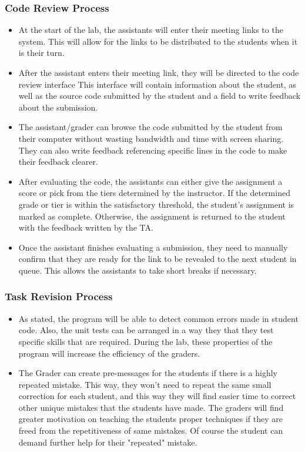 \documentclass[a4paper, 12pt]{article}
\begin{document}
    \subsubsection{Code Review Process}

    \begin{itemize}
        \item At the start of the lab, the assistants will enter their meeting links to the system.
        This will allow for the links to be distributed to the students when it is their turn.
        \item After the assistant enters their meeting link, they will be directed to the code review interface
        This interface will contain information about the student, as well as the source code submitted by the student
        and a field to write feedback about the submission.
        \item The assistant/grader can browse the code submitted by the student from their computer without wasting bandwidth
        and time with screen sharing. They can also write feedback referencing specific lines in the code to make their
        feedback clearer.
        \item After evaluating the code, the assistants can either give the assignment a score or pick
          from the tiers determined by the instructor. If the determined grade or tier is within the satisfactory
          threshold, the student's assignment is marked as complete. Otherwise, the assignment is returned to the
          student with the feedback written by the TA.
        \item Once the assistant finishes evaluating a submission, they need to manually confirm that they are
          ready for the link to be revealed to the next student in queue. This allows the assistants to take short
          breaks if necessary.
    \end{itemize}

    \subsubsection{Task Revision Process}

    \begin{itemize}
      \item As stated, the program will be able to detect common errors made in student code.
      Also, the unit tests can be arranged in a way they that they test specific skills that are
      required. During the lab, these properties of the program will increase the efficiency of the
      graders.
      \item The Grader can create pre-messages for the students if there is a highly repeated
      mistake. This way, they won't need to repeat the same small correction for each student,
      and this way they will find easier time to correct other unique mistakes that the students
      have made. The graders will find greater motivation on teaching the students proper techniques
      if they are freed from the repetitiveness of same mistakes. Of course the student can demand
      further help for their "repeated" mistake.
    \end{itemize}
\end{document}
